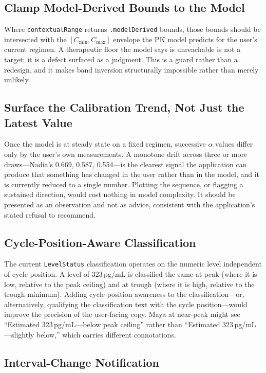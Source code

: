 \documentclass[11pt,a4paper]{article}
\newcommand{\code}[1]{\texttt{\small #1}}
\begin{document}
\subsection{Clamp Model-Derived Bounds to the Model}
\label{sec:impl_clamp}

Where \code{contextualRange} returns \code{.modelDerived} bounds, those
bounds should be intersected with the $[C_{\min}, C_{\max}]$ envelope the PK
model predicts for the user's current regimen. A therapeutic floor the
model says is unreachable is not a target; it is a defect surfaced as a
judgment. This is a guard rather than a redesign, and it makes band
inversion structurally impossible rather than merely unlikely.

\subsection{Surface the Calibration Trend, Not Just the Latest Value}
\label{sec:impl_trend}

Once the model is at steady state on a fixed regimen, successive $\alpha$
values differ only by the user's own measurements. A monotone drift across
three or more draws---Nadia's 0.669, 0.587, 0.554---is the clearest signal
the application can produce that something has changed in the user rather
than in the model, and it is currently reduced to a single number. Plotting
the sequence, or flagging a sustained direction, would cost nothing in
model complexity. It should be presented as an observation and not as
advice, consistent with the application's stated refusal to recommend.

\subsection{Cycle-Position-Aware Classification}

The current \code{LevelStatus} classification operates on the numeric level
independent of cycle position. A level of 323\,pg/mL is classified the same
at peak (where it is low, relative to the peak ceiling) and at trough (where
it is high, relative to the trough minimum). Adding cycle-position awareness
to the classification---or, alternatively, qualifying the classification
text with the cycle position---would improve the precision of the user-facing
copy. Maya at near-peak might see ``Estimated 323\,pg/mL---below peak
ceiling'' rather than ``Estimated 323\,pg/mL---slightly below,'' which
carries different connotations.

\subsection{Interval-Change Notification}
\end{document}
